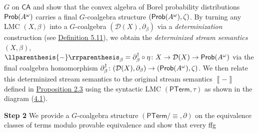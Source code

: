 \documentclass[11pt,a4paper]{amsart}
\begin{document}
\hypertarget{html:S4.SS0.SSSx1.p1.m1}{}\({G}\) on %
\hypertarget{html:S4.SS0.SSSx1.p1.m2}{}\({\mathsf{CA}}\) and show that the convex algebra of Borel probability distributions %
\hypertarget{html:S4.SS0.SSSx1.p1.m3}{}\({\text{\sf Prob}(A^{\omega})}\) carries a final %
\hypertarget{html:S4.SS0.SSSx1.p1.m4}{}\({G}\)-coalgebra structure %
\hypertarget{html:S4.SS0.SSSx1.p1.m5}{}\({(\text{\sf Prob}(A^{\omega}),\zeta)}\). By turning any LMC %
\hypertarget{html:S4.SS0.SSSx1.p1.m6}{}\({(X,\beta)}\) into a %
\hypertarget{html:S4.SS0.SSSx1.p1.m7}{}\({G}\)-coalgebra %
\hypertarget{html:S4.SS0.SSSx1.p1.m8}{}\({({\mathcal{D}}(X),\partial_{\beta})}\) via a \emph{determinization} construction (see \hyperlink{html:S5.Thmtheorem11}{Definition 5.11}), we obtain the \emph{determinized stream semantics} %
\hypertarget{html:S4.SS0.SSSx1.p1.m9}{}\({(X,\beta)}\), %
\hypertarget{html:S4.SS0.SSSx1.p1.m10}{}\({\llparenthesis{-}\rrparenthesis_{\beta}=\partial_{\beta}^{\dagger}\circ\eta\colon X\to{\mathcal{D}}(X)\to\text{\sf Prob}(A^{\omega})}\) via the final coalgebra homomorphism %
\hypertarget{html:S4.SS0.SSSx1.p1.m11}{}\({\partial_{\beta}^{\dagger}\colon({\mathcal{D}}(X),\partial_{\beta})\to(\text{\sf Prob}(A^{\omega}),\zeta)}\). We then relate this determinized stream semantics to the original stream semantics %
\hypertarget{html:S4.SS0.SSSx1.p1.m12}{}\({\left\llbracket{-}\right\rrbracket}\) defined in \hyperlink{html:S2.Thmtheorem3}{Proposition 2.3} using the syntactic LMC %
\hypertarget{html:S4.SS0.SSSx1.p1.m13}{}\({(\mathsf{PTerm},\tau)}\) as shown in the diagram (\hyperlink{html:S4.E1}{4.1}).
\par\medskip
\hypertarget{html:S4.SS0.SSSx2}{} \par\noindent\textbf{Step 2}\quad  %
\hypertarget{html:S4.SS0.SSSx2.p1}{} We provide a %
\hypertarget{html:S4.SS0.SSSx2.p1.m1}{}\({G}\)-coalgebra structure %
\hypertarget{html:S4.SS0.SSSx2.p1.m2}{}\({(\mathsf{PTerm}/{\equiv},\partial)}\) on the equivalence classes of terms modulo provable equivalence and show that every ffg %
\end{document}
